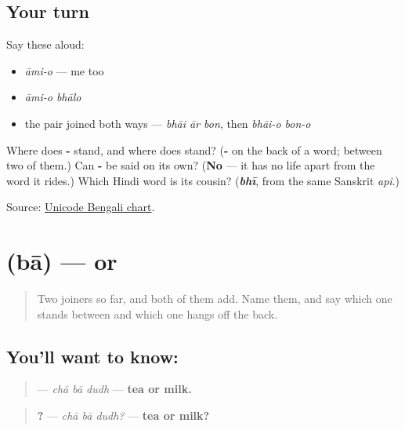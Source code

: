\subsection*{Your turn}
Say these aloud:

\begin{itemize}
\raggedright
  \item \emph{āmi-o} — me too
  \item \emph{āmi-o bhālo}
  \item the pair joined both ways — \emph{bhāi ār bon}, then \emph{bhāi-o bon-o}
\end{itemize}

\begin{tcolorbox}[breakable,colback=teal!4,colframe=teal!35!black,title={Before you move on}]
Where does \textbf{-} stand, and where does \textbf{} stand? (\textbf{-} on the back of a word; \textbf{} between two of them.) Can \textbf{-} be said on its own? (\textbf{No} — it has no life apart from the word it rides.) Which Hindi word is its cousin? (\emph{\textbf{bhī}}, from the same Sanskrit \emph{api}.)

Source: \href{https://www.unicode.org/charts/PDF/U0980.pdf}{Unicode Bengali chart}.
\end{tcolorbox}
\section[\texorpdfstring{\bn{বা} (bā)}{বা (bā)}]{ (bā) — or}

\label{lesson:BN-C17-ba}



\begin{quote}
Two joiners so far, and both of them add. Name them, and say which one stands between and which one hangs off the back.
\end{quote}

\subsection*{You'll want to know: }
\begin{quote}
\textbf{  } — \emph{chā bā dudh} — \textbf{tea or milk.}
\end{quote}

\begin{quote}
\textbf{  ?} — \emph{chā bā dudh?} — \textbf{tea or milk?}
\end{quote}

